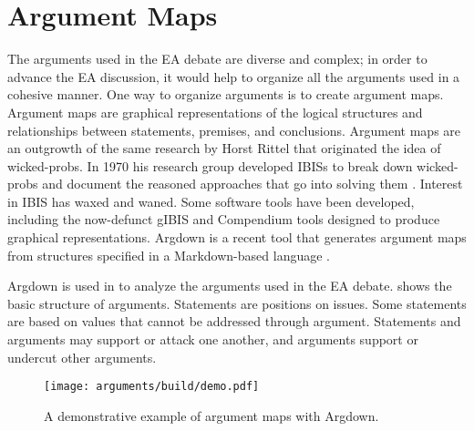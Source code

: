 \section{Argument Maps}
\label{sec-arg-maps-intro}

The arguments used in the \ac{EA} debate are diverse and complex; in order to advance the \ac{EA} discussion, it would
help to organize all the arguments used in a cohesive manner. One way to organize arguments is to create argument maps.
Argument maps are graphical representations of the logical structures and relationships between statements, premises,
and conclusions. Argument maps are an outgrowth of the same research by Horst Rittel that originated the idea of
\acp{wicked-prob}. In 1970 his research group developed \acp{IBIS} to break down \acp{wicked-prob} and document the
reasoned approaches that go into solving them \cite{kunz_issues_1970}. Interest in \ac{IBIS} has waxed and waned. Some
software tools have been developed, including the now-defunct gIBIS \cite{conklin_gibis_1988} and Compendium
\cite{dutoit_hypermedia_2006} tools designed to produce graphical representations. Argdown is a recent tool that
generates argument maps from structures specified in a Markdown-based language \cite{voigt_argdown_2018}.

Argdown is used in  to analyze the arguments used in the \ac{EA} debate. 
shows the basic structure of arguments. Statements are positions on issues. Some statements are based on values that
cannot be addressed through argument. Statements and arguments may support or attack one another, and arguments support
or undercut other arguments.

\begin{figure}[ht]
    \centering\CaptionFontSize
    \texttt{[image: arguments/build/demo.pdf]}
    \caption[Argdown Demo]{A demonstrative example of argument maps with Argdown.}
    \label{fig-args-demo}
\end{figure}




